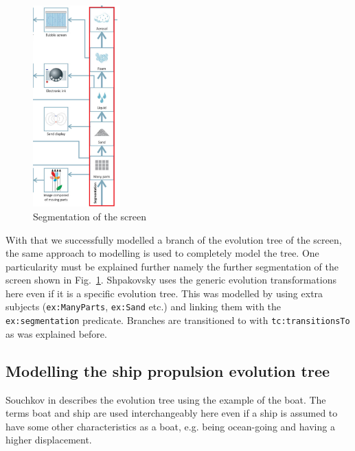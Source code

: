 \documentclass[11pt,a4paper]{article}
\begin{document}
\begin{figure}
  \begin{center}\vspace*{-1em}
    \includegraphics[width=0.3\textwidth]{figures/segmentation.png}
  \end{center}
  \caption{\small Segmentation of the screen \cite{Shpakovsky2016}}
  \label{fig:segmentation}
\end{figure}

With that we successfully modelled a branch of the evolution tree of the
screen, the same approach to modelling is used to completely model the tree.
One particularity must be explained further namely the further segmentation of
the screen shown in Fig.~\ref{fig:segmentation}. Shpakovsky uses the generic
evolution transformations here even if it is a specific evolution tree. This
was modelled by using extra subjects (\texttt{ex:ManyParts}, \texttt{ex:Sand}
etc.) and linking them with the \texttt{ex:segmentation} predicate. Branches
are transitioned to with \texttt{tc:transitionsTo} as was explained before.


\subsection{Modelling the ship propulsion evolution tree}

Souchkov in \cite{KS} describes the evolution tree using the example of the
boat. The terms boat and ship are used interchangeably here even if a ship is
assumed to have some other characteristics as a boat, e.g. being ocean-going
and having a higher displacement. 
\end{document}
